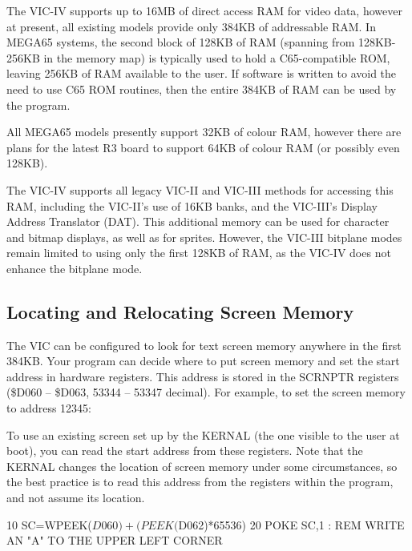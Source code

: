 The VIC-IV supports up to 16MB of direct access RAM for video data, however at present, all existing models provide only 384KB of addressable RAM.
In MEGA65 systems, the second block of 128KB of RAM (spanning from 128KB-256KB in the memory map) is typically used to hold a C65-compatible ROM,
leaving 256KB of RAM available to the user. If software is written to avoid the need to use C65 ROM routines, then the entire 384KB of RAM can be used by the program.

All MEGA65 models presently support 32KB of colour RAM, however there are plans for the latest R3 board to support 64KB of colour RAM (or possibly even 128KB).

The VIC-IV supports all legacy VIC-II and VIC-III methods for accessing this RAM, including the VIC-II's use of 16KB banks, and the VIC-III's Display Address Translator (DAT).  This additional memory can be used for character and bitmap displays, as well as for sprites.  However, the VIC-III bitplane modes remain limited to using only the first 128KB of RAM, as the VIC-IV does not enhance the bitplane mode.

\subsection{Locating and Relocating Screen Memory}

The VIC can be configured to look for text screen memory anywhere in the first 384KB. Your program can decide where to put screen memory and set the start address in hardware registers. This address is stored in the SCRNPTR registers (\$D060 -- \$D063, 53344 -- 53347 decimal). For example, to set the screen memory to address 12345:


To use an existing screen set up by the KERNAL (the one visible to the user at boot), you can read the start address from these registers. Note that the KERNAL changes the location of screen memory under some circumstances, so the best practice is to read this address from the registers within the program, and not assume its location.

\begin{screencode}
10 SC=WPEEK($D060)+(PEEK($D062)*65536)
20 POKE SC,1 : REM WRITE AN "A" TO THE UPPER LEFT CORNER
\end{screencode}

